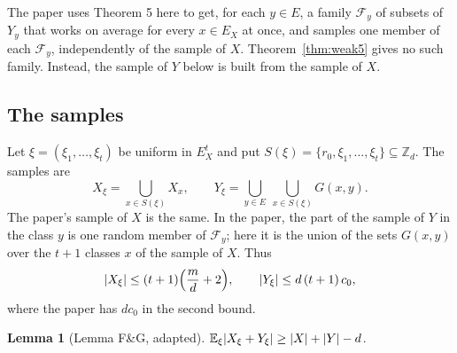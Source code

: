 \documentclass[11pt]{amsart}
\newtheorem{lemma}[theorem]{Lemma}
\theoremstyle{remark}
\newcommand{\Z}{\mathbb{Z}}
\newcommand{\E}{\mathbb{E}}
\DeclarePairedDelimiter{\abs}{\lvert}{\rvert}
\begin{document}
The paper uses Theorem 5 here to get, for each $y \in E$, a family $\mathcal F_y$ of subsets of
$Y_y$ that works on average for every $x \in E_X$ at once, and samples one member of each
$\mathcal F_y$, independently of the sample of $X$. Theorem~\ref{thm:weak5} gives no such family.
Instead, the sample of $Y$ below is built from the sample of $X$.

\subsection*{The samples}
Let $\xi = (\xi_1, \dots, \xi_t)$ be uniform in $E_X^t$ and put
$S(\xi) = \{r_0, \xi_1, \dots, \xi_t\} \subseteq \Z_d$. The samples are
\[
  X_\xi = \bigcup_{x \in S(\xi)} X_x ,
  \qquad
  Y_\xi = \bigcup_{y \in E}\ \bigcup_{x \in S(\xi)} G(x, y) .
\]
The paper's sample of $X$ is the same. In the paper, the part of the sample of $Y$ in the class
$y$ is one random member of $\mathcal F_y$; here it is the union of the sets $G(x, y)$ over the
$t + 1$ classes $x$ of the sample of $X$. Thus
\[
  \abs{X_\xi} \le (t + 1)\Bigl(\frac{m}{d} + 2\Bigr),
  \qquad
  \abs{Y_\xi} \le d\,(t + 1)\,c_0 ,
\]
where the paper has $d c_0$ in the second bound.

\begin{lemma}[Lemma F\&G, adapted]\label{lem:fg}
$\E_\xi \abs{X_\xi + Y_\xi} \ge \abs{X} + \abs{Y} - d$.
\end{lemma}
\end{document}
